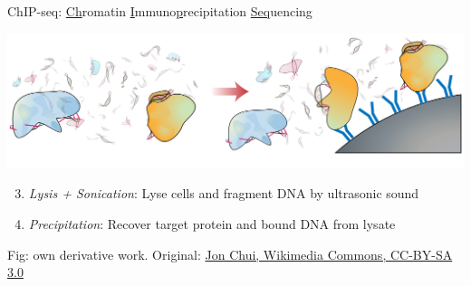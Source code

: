 \documentclass[10pt]{beamer}
\newcommand{\credit}[1]{{\vspace{\fill} \par \raggedleft \scriptsize \mdseries \color{mDarkBrown} #1 \par}}
\begin{document}
\begin{frame}{ChIP-seq: \underline{Ch}romatin \underline{I}mmuno\underline{p}recipitation \underline{Seq}uencing}
	\vspace{3em}
	\begin{center}
		\includegraphics[width=\textwidth]{./figures/ChIPseq2.png}
	\end{center}
	\begin{minipage}[t]{.49\linewidth}
		\begin{enumerate}
			\setcounter{enumi}{2}
			\item \textit{Lysis + Sonication}: Lyse cells and fragment DNA by ultrasonic sound
		\end{enumerate}
	\end{minipage}
	\begin{minipage}[t]{.49\linewidth}
		\begin{enumerate}
			\setcounter{enumi}{3}
			\item \textit{Precipitation}: Recover target protein and bound DNA from lysate
		\end{enumerate}
	\end{minipage}
	\credit{Fig: own derivative work. Original: \href{http://commons.wikimedia.org/wiki/File:Chromatin\_immunoprecipitation\_sequencing.svg}{Jon Chui, Wikimedia Commons, CC-BY-SA 3.0}}
\end{frame}
\end{document}
